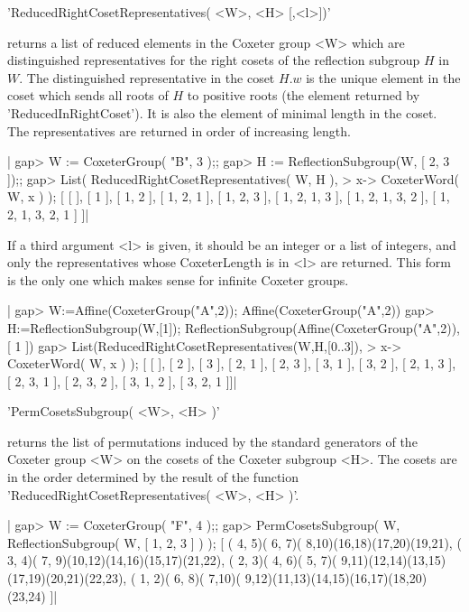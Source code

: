 'ReducedRightCosetRepresentatives( <W>, <H> [,<l>])'

returns a  list of reduced elements  in the Coxeter group  <W> which are
distinguished  representatives for  the right  cosets of  the reflection
subgroup $H$ in $W$. The distinguished representative in the coset $H.w$
is the  unique element  in the  coset which  sends all  roots of  $H$ to
positive roots  (the element  returned by 'ReducedInRightCoset').  It is
also the element of minimal length in the coset. The representatives are
returned in order of increasing length.

|    gap> W := CoxeterGroup( "B", 3 );;
    gap> H := ReflectionSubgroup(W, [ 2, 3 ]);;
    gap> List( ReducedRightCosetRepresentatives( W, H ),
    >                                x-> CoxeterWord( W, x ) );
    [ [  ], [ 1 ], [ 1, 2 ], [ 1, 2, 1 ], [ 1, 2, 3 ], [ 1, 2, 1, 3 ],
      [ 1, 2, 1, 3, 2 ], [ 1, 2, 1, 3, 2, 1 ] ]|

If  a third argument  <l> is given,  it should be  an integer or  a list of
integers,  and only the  representatives whose CoxeterLength  is in <l> are
returned.  This form is the only one which makes sense for infinite Coxeter
groups.

|    gap> W:=Affine(CoxeterGroup("A",2));
    Affine(CoxeterGroup("A",2))
    gap> H:=ReflectionSubgroup(W,[1]);
    ReflectionSubgroup(Affine(CoxeterGroup("A",2)), [ 1 ])
    gap> List(ReducedRightCosetRepresentatives(W,H,[0..3]),
    >                                x-> CoxeterWord( W, x ) );
    [ [  ], [ 2 ], [ 3 ], [ 2, 1 ], [ 2, 3 ], [ 3, 1 ], [ 3, 2 ],
      [ 2, 1, 3 ], [ 2, 3, 1 ], [ 2, 3, 2 ], [ 3, 1, 2 ], [ 3, 2, 1 ]]|


'PermCosetsSubgroup( <W>, <H> )'

returns the  list of permutations induced  by  the standard generators of
the Coxeter  group <W> on  the cosets of the Coxeter  subgroup  <H>.  The
cosets  are  in the   order determined by   the  result of   the function
'ReducedRightCosetRepresentatives( <W>, <H> )'.

|    gap> W := CoxeterGroup( "F", 4 );;
    gap> PermCosetsSubgroup( W, ReflectionSubgroup( W, [ 1, 2, 3 ] ) );
    [ ( 4, 5)( 6, 7)( 8,10)(16,18)(17,20)(19,21),
      ( 3, 4)( 7, 9)(10,12)(14,16)(15,17)(21,22),
      ( 2, 3)( 4, 6)( 5, 7)( 9,11)(12,14)(13,15)(17,19)(20,21)(22,23),
      ( 1, 2)( 6, 8)( 7,10)( 9,12)(11,13)(14,15)(16,17)(18,20)(23,24) ]|

